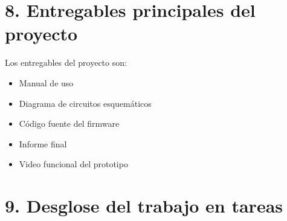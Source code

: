\documentclass[
11pt, %
codirector, %
]{charter}
\begin{document}
\section{8. Entregables principales del proyecto}
\label{sec:entregables}

Los entregables del proyecto son:

\begin{itemize}
	\item Manual de uso
	\item Diagrama de circuitos esquemáticos
	\item Código fuente del firmware
	\item Informe final
	\item Video funcional del prototipo
\end{itemize}


\section{9. Desglose del trabajo en tareas}
\label{sec:wbs}
\end{document}
